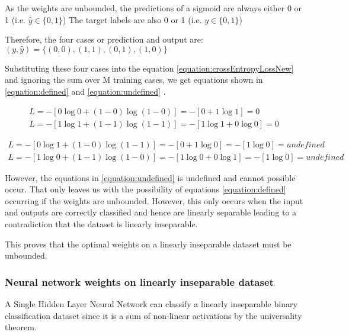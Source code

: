 \documentclass[a4paper,12pt]{article}
\begin{document}
As the weights are unbounded, the predictions of a sigmoid are always either 0 or 1 (i.e. $ \hat{y} \in \{0, 1\}$) The target labels are also 0 or 1 (i.e. $y \in \{0, 1\}$)

Therefore, the four cases or prediction and output are: 
$(y, \hat{y}) = \{(0, 0), (1, 1), (0, 1), (1, 0)\}$

Substituting these four cases into the equation \ref{equation:crossEntropyLossNew} and ignoring the sum over M training cases, we get equations shown in \ref{equation:defined} and \ref{equation:undefined} . 

\begin{equation}
\label{equation:defined}
\begin{split}
L = - [0 \log 0 + (1 - 0) \log ( 1 - 0)] = - [0 + 1\log1] = 0 \\
L = - [1 \log 1 + (1 - 1) \log ( 1 - 1)] = - [1\log1 + 0\log0] = 0
\end{split}
\end{equation}

\begin{equation}
\label{equation:undefined}
\begin{split}
L = - [0 \log 1 + (1 - 0) \log (1 - 1)] = - [0 + 1 \log 0] = - [1 \log 0] = undefined \\
L = - [1 \log 0 + (1 - 1) \log (1 - 0)] = - [1 \log 0 + 0\log1] = - [1 \log 0 ] = undefined
\end{split}
\end{equation}

However, the equations in \ref{equation:undefined} is undefined and cannot possible occur. That only leaves us with the possibility of equations \ref{equation:defined} occurring if the weights are unbounded. However, this only occurs when the input and outputs are correctly classified and hence are linearly separable leading to a contradiction that the dataset is linearly inseparable. 

This proves that the optimal weights on a linearly inseparable dataset must be unbounded. 
\clearpage
\subsubsection{Neural network weights on linearly inseparable dataset}

A Single Hidden Layer Neural Network can classify a linearly inseparable binary classification dataset
since it is a sum of non-linear activations by the universality theorem.
\end{document}
